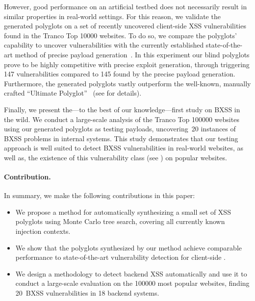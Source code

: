 However, good performance on an artificial testbed does not necessarily result in similar properties in real-world settings. For this reason, we validate the generated polyglots on a set of recently uncovered client-side XSS vulnerabilities found in the Tranco Top \num{10000} websites. To do so, we compare the polyglots' capability to uncover vulnerabilities with the currently established state-of-the-art method of precise payload generation~\cite{StoPfiKaiLek+15,LekStoJoh13,MelDasShaBau+18,BenKleBarJoh21,KleBarBen+22,stock2017web}. In this experiment our blind polyglots prove to be highly competitive with precise exploit generation, through triggering 147 vulnerabilities compared to 145 found by the precise payload generation. Furthermore, the generated polyglots vastly outperform the well-known, manually crafted ``Ultimate Polyglot''~\cite{ultimate-polyglot} (see  for details).

Finally, we present the---to the best of our knowledge---first study on BXSS in the wild. We conduct a large-scale analysis of the Tranco Top \num{100000} websites using our generated polyglots as testing payloads, uncovering~\num{20} instances of BXSS problems in internal systems. This study demonstrates that our testing approach is well suited to detect BXSS vulnerabilities in real-world websites, as well as, the existence of this vulnerability class (see ) on popular websites. 


\paragraph{Contribution.} In summary, we make the following contributions in this paper:
\begin{itemize}
\setlength\itemsep{-0.2em} %

\item We propose a method for automatically synthesizing a small set of XSS polyglots using Monte Carlo tree search, covering all currently known injection contexts. %

\item We show that the polyglots synthesized by our method achieve comparable performance to state-of-the-art vulnerability detection for client-side \xss{}. %

\item We design a methodology to detect backend XSS automatically and use it to conduct a large-scale evaluation on the \num{100000} most popular websites, finding \num{20}~BXSS vulnerabilities in \num{18} backend systems. %
\end{itemize}

